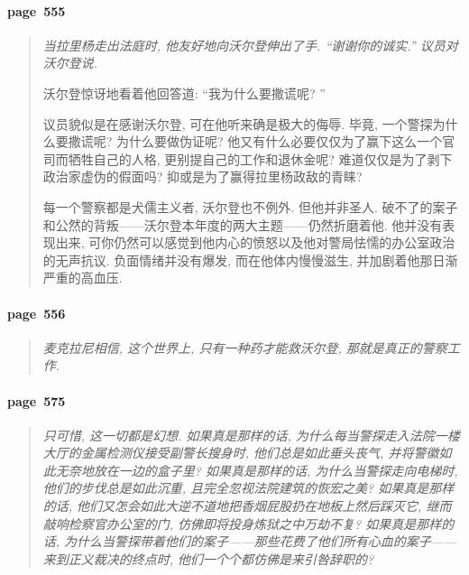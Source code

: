 \paragraph*{page~555}
\begin{quotation}
    \itshape
    当拉里杨走出法庭时, 他友好地向沃尔登伸出了手. ``谢谢你的诚实.'' 议员对沃尔登说.

    沃尔登惊讶地看着他回答道: ``我为什么要撒谎呢? ''

    议员貌似是在感谢沃尔登, 可在他听来确是极大的侮辱. 毕竟, 一个警探为什么要撒谎呢? 为什么要做伪证呢? 他又有什么必要仅仅为了赢下这么一个官司而牺牲自己的人格, 更别提自己的工作和退休金呢? 难道仅仅是为了剥下政治家虚伪的假面吗? 抑或是为了赢得拉里杨政敌的青睐?

    每一个警察都是犬儒主义者, 沃尔登也不例外. 但他并非圣人. 破不了的案子和公然的背叛------沃尔登本年度的两大主题------仍然折磨着他. 他并没有表现出来, 可你仍然可以感觉到他内心的愤怒以及他对警局怯懦的办公室政治的无声抗议. 负面情绪并没有爆发, 而在他体内慢慢滋生, 并加剧着他那日渐严重的高血压. 
\end{quotation}

\paragraph*{page~556}
\begin{quotation}
    \itshape
    麦克拉尼相信, 这个世界上, 只有一种药才能救沃尔登, 那就是真正的警察工作. 
\end{quotation}

\paragraph*{page~575}
\begin{quotation}
    \itshape
    只可惜, 这一切都是幻想. 如果真是那样的话, 为什么每当警探走入法院一楼大厅的金属检测仪接受副警长搜身时, 他们总是如此垂头丧气, 并将警徽如此无奈地放在一边的盒子里? 如果真是那样的话, 为什么当警探走向电梯时, 他们的步伐总是如此沉重, 且完全忽视法院建筑的恢宏之美? 如果真是那样的话, 他们又怎会如此大逆不道地把香烟屁股扔在地板上然后踩灭它, 继而敲响检察官办公室的门, 仿佛即将投身炼狱之中万劫不复? 如果真是那样的话, 为什么当警探带着他们的案子------那些花费了他们所有心血的案子------来到正义裁决的终点时, 他们一个个都仿佛是来引咎辞职的? 
\end{quotation}

